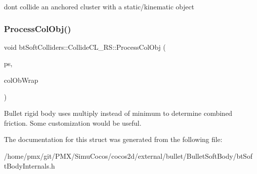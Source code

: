 don\textquotesingle{}t collide an anchored cluster with a static/kinematic object \mbox{\label{structbtSoftColliders_1_1CollideCL__RS_a34f463ddcfcda480e9843277d4bd732e}} 
\subsubsection{\texorpdfstring{Process\+Col\+Obj()}{ProcessColObj()}}
{\footnotesize\ttfamily void bt\+Soft\+Colliders\+::\+Collide\+C\+L\+\_\+\+R\+S\+::\+Process\+Col\+Obj (\begin{DoxyParamCaption}\item[{\hyperlink{classbtSoftBody}{bt\+Soft\+Body} $\ast$}]{ps,  }\item[{const \hyperlink{structbtCollisionObjectWrapper}{bt\+Collision\+Object\+Wrapper} $\ast$}]{col\+Ob\+Wrap }\end{DoxyParamCaption})\hspace{0.3cm}{\ttfamily [inline]}}

Bullet rigid body uses multiply instead of minimum to determine combined friction. Some customization would be useful. 

The documentation for this struct was generated from the following file\+:\begin{DoxyCompactItemize}
\item 
/home/pmx/git/\+P\+M\+X/\+Simu\+Cocos/cocos2d/external/bullet/\+Bullet\+Soft\+Body/bt\+Soft\+Body\+Internals.\+h\end{DoxyCompactItemize}
